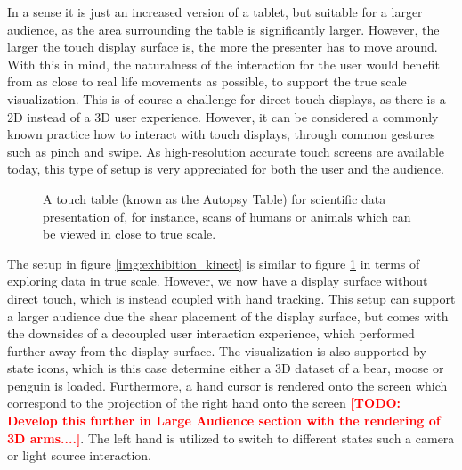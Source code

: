 \documentclass[review,journal]{vgtc}         %
\newcommand{\todo}[1]{\textbf{\textcolor{red}{[TODO: {#1}]}}}
\begin{document}
In a sense it is just an increased version of a tablet, but suitable for a larger audience, as the area surrounding the table is significantly larger.
However, the larger the touch display surface is, the more the presenter has to move around.
With this in mind, the naturalness of the interaction for the user would benefit from as close to real life movements as possible, to support the true scale visualization.
This is of course a challenge for direct touch displays, as there is a 2D instead of a 3D user experience.
However, it can be considered a commonly known practice how to interact with touch displays, through common gestures such as pinch and swipe.
As high-resolution accurate touch screens are available today, this type of setup is very appreciated for both the user and the audience.

\begin{figure}[htb]
	\centering
	\caption{A touch table (known as the Autopsy Table) for scientific data presentation of, for instance, scans of humans or animals which can be viewed in close to true scale.}
	\label{img:exhibition_table}
\end{figure}

The setup in figure \ref{img:exhibition_kinect} is similar to figure \ref{img:exhibition_table} in terms of exploring data in true scale.
However, we now have a display surface without direct touch, which is instead coupled with hand tracking.
This setup can support a larger audience due the shear placement of the display surface, but comes with the downsides of a decoupled user interaction experience, which performed further away from the display surface.
The visualization is also supported by state icons, which is this case determine either a 3D dataset of a bear, moose or penguin is loaded.
Furthermore, a hand cursor is rendered onto the screen which correspond to the projection of the right hand onto the screen \todo{Develop this further in Large Audience section with the rendering of 3D arms....}.
The left hand is utilized to switch to different states such a camera or light source interaction.
\end{document}

